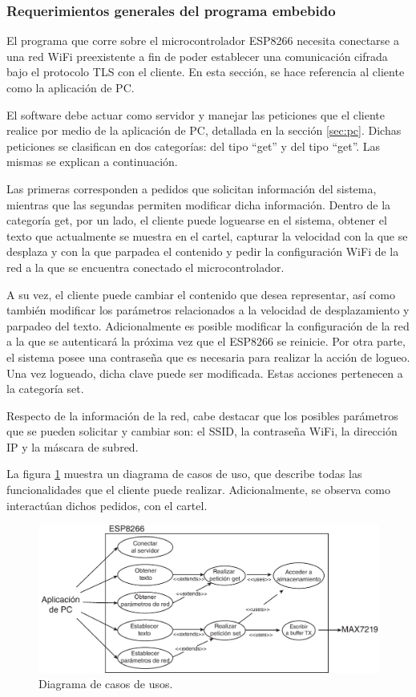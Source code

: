 \subsubsection{Requerimientos generales del programa embebido}

El programa que corre sobre el microcontrolador ESP8266 necesita conectarse a una red WiFi preexistente a fin de poder establecer una comunicación cifrada bajo el protocolo TLS con el cliente.
En esta sección, se hace referencia al cliente como la aplicación de PC.

El software debe actuar como servidor y manejar las peticiones que el cliente realice por medio de la aplicación de PC, detallada en la sección \ref{sec:pc}.
Dichas peticiones se clasifican en dos categorías: del tipo \enquote{get} y del tipo \enquote{get}. Las mismas se explican a continuación.

Las primeras corresponden a pedidos que solicitan información del sistema, mientras que las segundas permiten modificar dicha información.
Dentro de la categoría get, por un lado, el cliente puede loguearse en el sistema, obtener el texto que actualmente se muestra en el cartel, capturar la velocidad con la que se desplaza y con la que parpadea el contenido y pedir la configuración WiFi de la red a la que se encuentra conectado el microcontrolador.

A su vez, el cliente puede cambiar el contenido que desea representar, así como también modificar los parámetros relacionados a la velocidad de desplazamiento y parpadeo del texto.
Adicionalmente es posible modificar la configuración de la red a la que se autenticará la próxima vez que el ESP8266 se reinicie.
Por otra parte, el sistema posee una contraseña que es necesaria para realizar la acción de logueo.
Una vez logueado, dicha clave puede ser modificada. Estas acciones pertenecen a la categoría set.

Respecto de la información de la red, cabe destacar que los posibles parámetros que se pueden solicitar y cambiar son: el SSID, la contraseña WiFi, la dirección IP y la máscara de subred.

La figura \ref{fig:diagrama_casos_de_uso} muestra un diagrama de casos de uso, que describe todas las funcionalidades que el cliente puede realizar.
Adicionalmente, se observa como interactúan dichos pedidos, con el cartel.

\begin{figure}[!ht]
	\centering
	\includegraphics[width=1\linewidth]{imagenes/sistema-caso-de-uso.pdf}
	\caption{Diagrama de casos de usos.}
	\label{fig:diagrama_casos_de_uso}
\end{figure}

